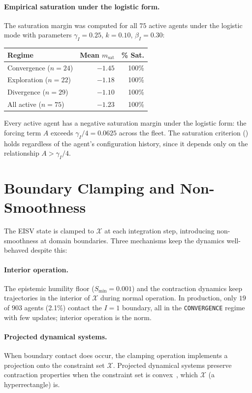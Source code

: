 \documentclass[11pt,twocolumn]{article}
\begin{document}
\paragraph{Empirical saturation under the logistic form.}
The saturation margin was computed for all $75$ active agents
under the logistic mode with parameters $\gamma_I = 0.25$,
$k = 0.10$, $\beta_I = 0.30$:

\begin{center}
\small
\begin{tabular}{@{}lrr@{}}
\toprule
\textbf{Regime} & \textbf{Mean $m_{\text{sat}}$} & \textbf{\% Sat.} \\
\midrule
Convergence ($n=24$) & $-1.45$ & 100\% \\
Exploration ($n=22$) & $-1.18$ & 100\% \\
Divergence ($n=29$) & $-1.10$ & 100\% \\
\midrule
All active ($n=75$) & $-1.23$ & 100\% \\
\bottomrule
\end{tabular}
\end{center}

Every active agent has a negative saturation margin under the
logistic form: the forcing term $A$ exceeds $\gamma_I/4 = 0.0625$
across the fleet. The saturation criterion
() holds regardless of the agent's
configuration history, since it depends only on the relationship
$A > \gamma_I/4$.


\section{Boundary Clamping and Non-Smoothness}
\label{app:boundary-clamping}

The EISV state is clamped to $\mathcal{X}$ at each integration step,
introducing non-smoothness at domain boundaries. Three mechanisms
keep the dynamics well-behaved despite this:

\paragraph{Interior operation.}
The epistemic humility floor ($S_{\min} = 0.001$) and the contraction
dynamics keep trajectories in the interior of $\mathcal{X}$ during
normal operation. In production, only $19$ of $903$ agents (2.1\%)
contact the $I = 1$ boundary, all in the \texttt{CONVERGENCE} regime
with few updates; interior operation is the norm.

\paragraph{Projected dynamical systems.}
When boundary contact does occur, the clamping operation implements
a projection onto the constraint set $\mathcal{X}$. Projected
dynamical systems preserve contraction properties when the
constraint set is convex~\cite{lohmiller1998contraction}, which
$\mathcal{X}$ (a hyperrectangle) is.
\end{document}
